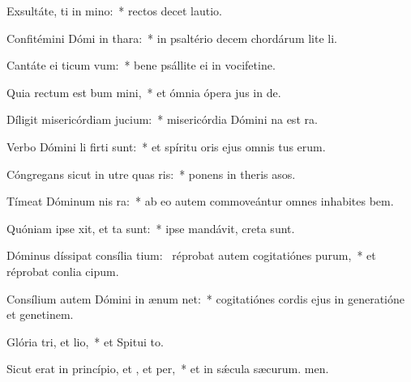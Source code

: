 \item Exsultáte, ti in mino:~* rectos decet lautio.
\item Confitémini Dómi in thara:~* in psaltério decem chordárum lite li.
\item Cantáte ei ticum vum:~* bene psállite ei in vocifetine.
\item Quia rectum est bum mini,~* et ómnia ópera jus in de.
\item Díligit misericórdiam  jucium:~* misericórdia Dómini na est ra.
\item Verbo Dómini li firti sunt:~* et spíritu oris ejus omnis tus erum.
\item Cóngregans sicut in utre quas ris:~* ponens in theris asos.
\item Tímeat Dóminum nis ra:~* ab eo autem commoveántur omnes inhabites bem.
\item Quóniam ipse xit, et ta sunt:~* ipse mandávit,  creta sunt.
\item Dóminus díssipat consília tium:~\pscross{} réprobat autem cogitatiónes purum,~* et réprobat conlia cipum.
\item Consílium autem Dómini in ænum net:~* cogitatiónes cordis ejus in generatióne et genetinem.
\item Glória tri, et lio,~* et Spitui to.
\item Sicut erat in princípio, et , et per,~* et in sǽcula sæcurum. men.
